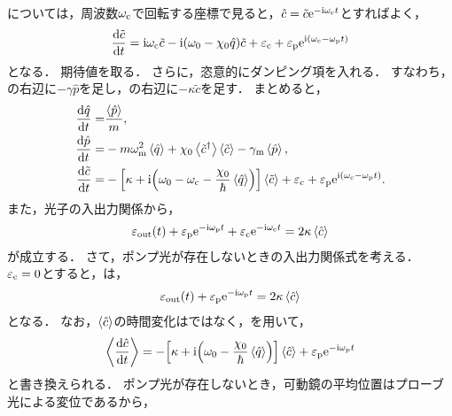       については，周波数$\omega_{\mathrm{c}}$で回転する座標で見ると，$\hat{c} = \tilde{c}\mathrm{e}^{-\mathrm{i}\omega_{\mathrm{c}}t}$とすればよく，
      \begin{align}
        \dv{\tilde{c}}{t} = \mathrm{i}\omega_{\mathrm{c}}\tilde{c} - \mathrm{i}\qty(\omega_0 - \chi_0\hat{q})\tilde{c} + \varepsilon_{\mathrm{c}} + \varepsilon_{\mathrm{p}}\mathrm{e}^{\mathrm{i}\qty(\omega_{\mathrm{c}} - \omega_{\mathrm{p}}t)} \label{PhysRevA.81.041803-eom-c-2}
      \end{align}
      となる．
      期待値を取る．
      さらに，恣意的にダンピング項を入れる．
      すなわち，の右辺に$-\gamma\hat{p}$を足し，の右辺に$-\kappa\tilde{c}$を足す．
      まとめると，
      \begin{align}
        \dv{\hat{q}}{t} =& \frac{\ev{\hat{p}}}{m}, \label{PhysRevA.81.041803-eom-q-ev} \\ 
        \dv{\hat{p}}{t} =& -m\omega^2_{\r{m}}\ev{\hat{q}} + \chi_0\ev{\tilde{c}^{\dag}}\ev{\tilde{c}} - \gamma_{\r{m}}\ev{\hat{p}}, \label{PhysRevA.81.041803-eom-p-ev} \\ 
        \dv{\tilde{c}}{t} =& -\qty[\kappa + \i\qty(\omega_0 - \omega_{\r{c}} - \frac{\chi_0}{\hbar}\ev{\hat{q}})]\ev{\tilde{c}} + \epsilon_{\r{c}} + \epsilon_{\r{p}}\e^{\i\qty(\omega_{\r{c}} - \omega_{\r{p}}t)} \label{PhysRevA.81.041803-eom-c-ev}.
      \end{align}
      また，光子の入出力関係から，
      \begin{align}
        \epsilon_{\r{out}}(t) + \epsilon_{\r{p}}\e^{-\i\omega_{\r{p}}t} + \epsilon_{\r{c}}\e^{-\i\omega_{\r{c}}t} = 2\kappa\ev{\hat{c}} \label{PhysRevA.81.041803-io-relation}
      \end{align}
      が成立する．
      さて，ポンプ光が存在しないときの入出力関係式を考える．
      $\varepsilon_{\mathrm{c}} = 0$とすると，は，
      \begin{align}
        \epsilon_{\r{out}}(t) + \epsilon_{\r{p}}\e^{-\i\omega_{\r{p}}t} = 2\kappa\ev{\hat{c}}
      \end{align}
      となる．
      なお，$\ev{\hat{c}}$の時間変化はではなく，を用いて，
      \begin{align}
        \ev{\dv{\hat{c}}{t}} = -\qty[\kappa + \i\qty(\omega_0 - \frac{\chi_0}{\hbar}\ev{\hat{q}})]\ev{\hat{c}} + \epsilon_{\r{p}}\e^{-\i\omega_{\r{p}}t}
      \end{align}
      と書き換えられる．
      ポンプ光が存在しないとき，可動鏡の平均位置はプローブ光による変位であるから，
